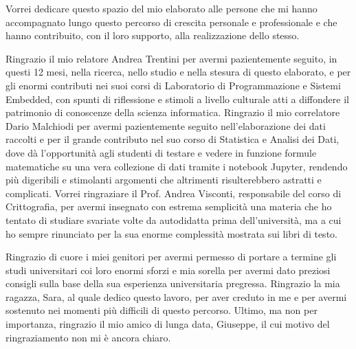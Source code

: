 
Vorrei dedicare questo spazio del mio elaborato alle persone che mi hanno accompagnato lungo questo percorso di crescita personale e professionale e che hanno contribuito, con il loro supporto, alla realizzazione dello stesso.

Ringrazio il mio relatore Andrea Trentini per avermi pazientemente seguito, in questi 12 mesi, nella ricerca, nello studio e nella stesura di questo elaborato, e per gli enormi contributi nei suoi corsi di Laboratorio di Programmazione e Sistemi Embedded, con spunti di riflessione e stimoli a livello culturale atti a diffondere il patrimonio di conoscenze della scienza informatica. Ringrazio il mio correlatore Dario Malchiodi per avermi pazientemente seguito nell'elaborazione dei dati raccolti e per il grande contributo nel suo corso di Statistica e Analisi dei Dati, dove dà l'opportunità agli studenti di testare e vedere in funzione formule matematiche su una vera collezione di dati tramite i notebook Jupyter, rendendo più digeribili e stimolanti argomenti che altrimenti risulterebbero astratti e complicati. Vorrei ringraziare il Prof. Andrea Visconti, responsabile del corso di Crittografia, per avermi insegnato con estrema semplicità una materia che ho tentato di studiare svariate volte da autodidatta prima dell'università, ma a cui ho sempre rinunciato per la sua enorme complessità mostrata sui libri di testo.

Ringrazio di cuore i miei genitori per avermi permesso di portare a termine gli studi universitari coi loro enormi sforzi e mia sorella per avermi dato preziosi consigli sulla base della sua esperienza universitaria pregressa. Ringrazio la mia ragazza, Sara, al quale dedico questo lavoro, per aver creduto in me e per avermi sostenuto nei momenti più difficili di questo percorso. Ultimo, ma non per importanza, ringrazio il mio amico di lunga data, Giuseppe, il cui motivo del ringraziamento non mi è ancora chiaro.